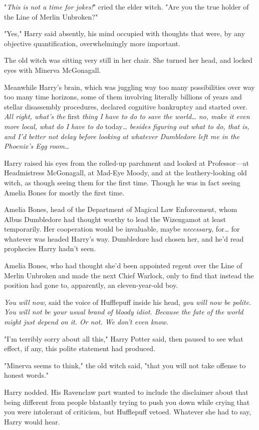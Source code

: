 "\emph{This is not a time for jokes!}" cried the elder witch. "Are you the true
holder of the Line of Merlin Unbroken?"

"Yes," Harry said absently, his mind occupied with thoughts that were, by any
objective quantification, overwhelmingly more important.

The old witch was sitting very still in her chair. She turned her head, and
locked eyes with Minerva McGonagall.

Meanwhile Harry's brain, which was juggling way too many possibilities over way
too many time horizons, some of them involving literally billions of years and
stellar disassembly procedures, declared cognitive bankruptcy and started over.
\emph{All right, what's the} first\emph{ thing I have to do to save the
world{\ldots} no, make it even more local, what do I have to do} today{\ldots}
\emph{besides figuring out what to do, that is, and I'd better not delay before
looking at whatever Dumbledore left me in the Phoenix's Egg room{\ldots}}

Harry raised his eyes from the rolled-up parchment and looked at Professor---at
Headmistress McGonagall, at Mad-Eye Moody, and at the leathery-looking old
witch, as though seeing them for the first time. Though he was in fact seeing
Amelia Bones for mostly the first time.

Amelia Bones, head of the Department of Magical Law Enforcement, whom Albus
Dumbledore had thought worthy to lead the Wizengamot at least temporarily. Her
cooperation would be invaluable, maybe \emph{necessary,} for{\ldots} for
whatever was headed Harry's way. Dumbledore had chosen her, and he'd read
prophecies Harry hadn't seen.

Amelia Bones, who had thought she'd been appointed regent over the Line of
Merlin Unbroken and made the next Chief Warlock, only to find that instead the
position had gone to, apparently, an eleven-year-old boy.

\emph{You will now,} said the voice of Hufflepuff inside his head, \emph{you
will now be polite. You will not be your usual brand of bloody idiot. Because
the fate of the world might just depend on it. Or not. We don't even know.}

"I'm terribly sorry about all this," Harry Potter said, then paused to see what
effect, if any, this polite statement had produced.

"Minerva seems to think," the old witch said, "that you will not take offense
to honest words."

Harry nodded. His Ravenclaw part wanted to include the disclaimer about that
being different from people blatantly trying to push you down while crying that
you were intolerant of criticism, but Hufflepuff vetoed. Whatever she had to
say, Harry would hear.

